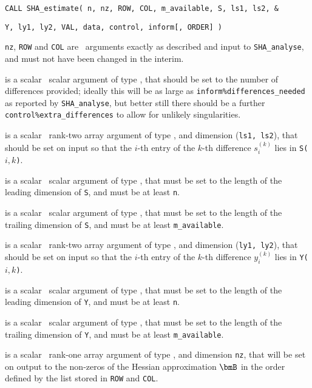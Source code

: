 \documentclass{galahad}
\newcommand{\packagename}{SHA}
\begin{document}
\hspace{8mm}
{\tt CALL \packagename\_estimate( n, nz, ROW, COL, m\_available, S, ls1, ls2, \&}
\vspace*{-1mm}

\hspace{42mm}
{\tt Y, ly1, ly2, VAL, data, control, inform[, ORDER] )}

\vspace*{-2mm}
\begin{description}
 {\tt nz}, {\tt ROW} and {\tt COL} are  \intentin\ arguments
exactly as described and input to {\tt \packagename\_analyse},
and must not have been changed in the interim.

is a scalar \intentin\ scalar argument of type \integer, that should
be set to the number of differences provided; ideally this will
be as large as {\tt inform\%differences\_needed} as reported by
{\tt \packagename\_\-analyse}, but better still there should be a
further {\tt control\%extra\_differences} to allow for unlikely singularities.

 is a scalar \intentin\ rank-two array argument of type
\realdp, and dimension ({\tt ls1, ls2}), that should be set on input
so that the $i$-th entry of the $k$-th difference $s_i^{(k)}$ lies in
{\tt S(}$i, k${\tt )}.

is a scalar \intentin\ scalar argument of type \integer, that must be
set to the length of the leading dimension of {\tt S}, and must be at least
{\tt n}.

is a scalar \intentin\ scalar argument of type \integer, that must be
set to the length of the trailing dimension of {\tt S}, and must be at least
{\tt m\_available}.

 is a scalar \intentin\ rank-two array argument of type
\realdp, and dimension ({\tt ly1, ly2}), that should be set on input
so that the $i$-th entry of the $k$-th difference $y_i^{(k)}$ lies in
{\tt Y(}$i, k${\tt )}.

is a scalar \intentin\ scalar argument of type \integer, that must be
set to the length of the leading dimension of {\tt Y}, and must be at least
{\tt n}.

is a scalar \intentin\ scalar argument of type \integer, that must be
set to the length of the trailing dimension of {\tt Y}, and must be at least
{\tt m\_available}.

 is a scalar \intentout\ rank-one array argument of type
\realdp, and dimension {\tt nz}, that will be set on output
to the non-zeros of the Hessian approximation $\bmB$ in the
order defined by the list stored in {\tt ROW} and {\tt COL}.


\end{description}
\end{document}
